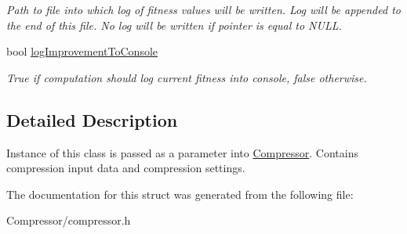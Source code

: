 \begin{DoxyCompactItemize}
\begin{DoxyCompactList}\small\item\em Path to file into which log of fitness values will be written. Log will be appended to the end of this file. No log will be written if pointer is equal to N\+U\+LL. \end{DoxyCompactList}\item 
bool \hyperlink{structlossycompressor_1_1_compressor_1_1_args_a995412fa423ab75e01215136e90435cd}{log\+Improvement\+To\+Console}\hypertarget{structlossycompressor_1_1_compressor_1_1_args_a995412fa423ab75e01215136e90435cd}{}\label{structlossycompressor_1_1_compressor_1_1_args_a995412fa423ab75e01215136e90435cd}

\begin{DoxyCompactList}\small\item\em True if computation should log current fitness into console, false otherwise. \end{DoxyCompactList}\end{DoxyCompactItemize}


\subsection{Detailed Description}
Instance of this class is passed as a parameter into \hyperlink{classlossycompressor_1_1_compressor}{Compressor}. Contains compression input data and compression settings. 

The documentation for this struct was generated from the following file\+:\begin{DoxyCompactItemize}
\item 
Compressor/compressor.\+h\end{DoxyCompactItemize}
